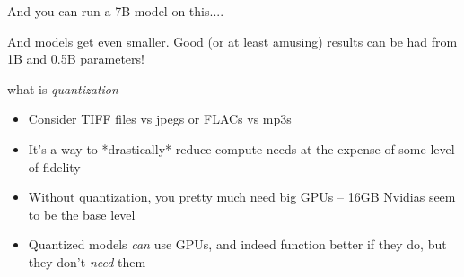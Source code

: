 \documentclass{beamer}
\begin{document}
\begin{frame}
	And you can run a 7B model on this....
\end{frame}



\begin{frame}[plain]
\end{frame}

\begin{frame}
	And models get even smaller. Good (or at least amusing) results can be had from 1B and 0.5B parameters!
\end{frame}

\begin{frame}{what is \textit{quantization}}
	\begin{itemize}
		\item Consider TIFF files vs jpegs or FLACs vs mp3s
		\pause
		\item It's a way to *drastically* reduce compute needs at the expense of some level of fidelity
		\pause
		\item Without quantization, you pretty much need big GPUs -- 16GB Nvidias seem to be the base level
		\pause
		\item Quantized models \textit{can} use GPUs, and indeed function better if they do, but they don't \textit{need} them
	\end{itemize}
\end{frame}
\end{document}
